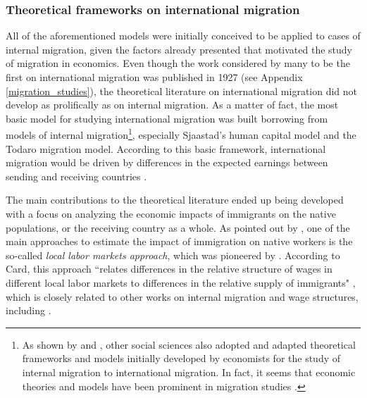 \subsubsection{Theoretical frameworks on international migration}

All of the aforementioned models were initially conceived to be applied to cases of internal migration, given the factors already presented that motivated the study of migration in economics. Even though the work considered by many to be the first on international migration was published in 1927 (see Appendix \ref{migration_studies}), the theoretical literature on international migration did not develop as prolifically as on internal migration. As a matter of fact, the most basic model for studying international migration was built borrowing from models of internal migration\footnote{As shown by \cite{massey_theories_1993} and \cite{king_theories_2012}, other social sciences also adopted and adapted theoretical frameworks and models initially developed by economists for the study of internal migration to international migration. In fact, it seems that economic theories and models have been prominent in migration studies \citep{massey_theories_1993, king_theories_2012}.}, especially Sjaastad's human capital model and the Todaro migration model. According to this basic framework, international migration would be driven by differences in the expected earnings between sending and receiving countries \citep{lalonde_economic_1997}.

The main contributions to the theoretical literature ended up being developed with a focus on analyzing the economic impacts of immigrants on the native populations, or the receiving country as a whole. As pointed out by \cite{card_is_2005}, one of the main approaches to estimate the impact of immigration on native workers is the so-called \textit{local labor markets approach}, which was pioneered by \cite{grossman_substitutability_1982}. According to Card, this approach ``relates differences in the relative structure of wages in different local labor markets to differences in the relative supply of immigrants" \citep[p. F302]{card_is_2005}, which is closely related to other works on internal migration and wage structures, including \cite{sjaastad_costs_1962}. 

